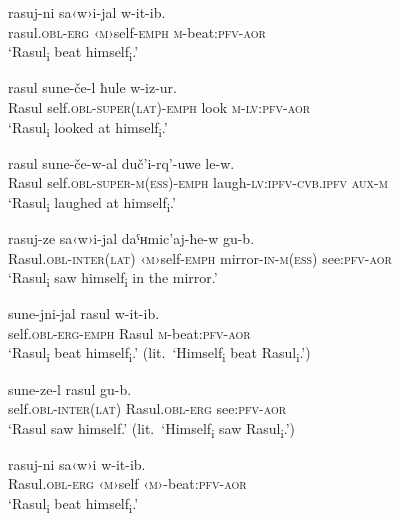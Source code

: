﻿\documentclass[output=paper]{langsci/langscibook}
\begin{document}
\ea \label{ex:10:3} %
\gll  rasuj-ni sa‹w›i-jal w-it-ib.\\
rasul.\textsc{obl}-\textsc{erg} ‹\textsc{m}›self-\textsc{emph} \textsc{m}-beat:\textsc{pfv}-\textsc{aor}\\
\glt `Rasul\textsubscript{i} beat himself\textsubscript{i}.'

\ex \label{ex:10:4} %
\gll  rasul sune-če-l ħule w-iz-ur.\\
Rasul self.\textsc{obl}-\textsc{super}(\textsc{lat})-\textsc{emph} look \textsc{m}-\textsc{lv}:\textsc{pfv}-\textsc{aor}\\ 
\glt `Rasul\textsubscript{i} looked at himself\textsubscript{i}.'

\ex \label{ex:10:5} %
\gll  rasul sune-če-w-al duč'i-rq'-uwe le-w.\\
Rasul self.\textsc{obl}-\textsc{super}-\textsc{m}(\textsc{ess})-\textsc{emph} laugh-\textsc{lv}:\textsc{ipfv}-\textsc{cvb.ipfv} \textsc{aux}-\textsc{m}\\ 
\glt `Rasul\textsubscript{i} laughed at himself\textsubscript{i}.'

\ex \label{ex:10:6} %
\gll  rasuj-ze sa‹w›i-jal daˤʜmic'aj-ħe-w gu-b.\\
Rasul.\textsc{obl}-\textsc{inter}(\textsc{lat}) ‹\textsc{m}›self-\textsc{emph} mirror-\textsc{in}-\textsc{m}(\textsc{ess}) see:\textsc{pfv}-\textsc{aor}\\ 
\glt `Rasul\textsubscript{i} saw himself\textsubscript{i} in the mirror.'

\ex \label{ex:10:7} %
\ea %
\gll *sune-jni-jal rasul w-it-ib.\\
self.\textsc{obl}-\textsc{erg}-\textsc{emph} Rasul \textsc{m}-beat:\textsc{pfv}-\textsc{aor}\\ 
\glt `Rasul\textsubscript{i} beat himself\textsubscript{i}.'
(lit.\ `Himself\textsubscript{i} beat Rasul\textsubscript{i}.')

\ex %
\gll *sune-ze-l rasul gu-b.\\
self.\textsc{obl}-\textsc{inter}(\textsc{lat}) Rasul.\textsc{obl}-\textsc{erg} see:\textsc{pfv}-\textsc{aor}\\ 
\glt `Rasul saw himself.'
(lit.\ `Himself\textsubscript{i} saw Rasul\textsubscript{i}.')
\z

\ex \label{ex:10:8} %
\gll  *rasuj-ni sa‹w›i w-it-ib.\\
Rasul.\textsc{obl}-\textsc{erg} ‹\textsc{m}›self ‹\textsc{m}›-beat:\textsc{pfv}-\textsc{aor}\\ 
\glt `Rasul\textsubscript{i} beat himself\textsubscript{i}.'
\z
\end{document}
